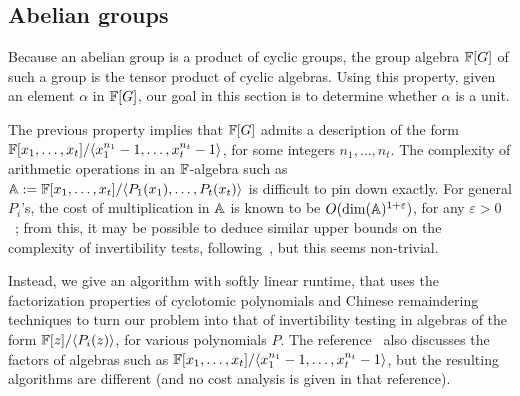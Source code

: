 
\subsection{Abelian groups}

Because an abelian group is a product of cyclic groups, the group
algebra $\mathbb{F}[G]$ of such a group is the tensor product of cyclic
algebras. Using this property, given an element $\alpha$ in $\mathbb{F}[G]$,
our goal in this section is to determine whether $\alpha$ is a unit.

The previous property implies that $\mathbb{F}[G]$ admits a description of the
form $\mathbb{F}[x_1,\dots,x_t]/\langle x_1^{n_1}-1,\dots,x_t^{n_t}-1\rangle$,
for some integers $n_1,\dots,n_t$. The complexity of arithmetic
operations in an $\mathbb{F}$-algebra such as $\mathbb{A}:=\mathbb{F}[x_1,\dots,x_t]/\langle
P_1(x_1),\dots,P_t(x_t)\rangle$ is difficult to pin down exactly. For
general $P_i$'s, the cost of multiplication in $\mathbb{A}$ is known to be
$O(\dim(\mathbb{A})^{1+\varepsilon})$, for any $\varepsilon >
0$~\cite[Theorem~2]{LiMoSc09}; from this, it may be possible to deduce
similar upper bounds on the complexity of invertibility tests,
following~\cite{DaMMMScXi06}, but this seems non-trivial.

Instead, we give an algorithm with softly linear runtime, that uses
the factorization properties of cyclotomic polynomials and Chinese
remaindering techniques to turn our problem into that of invertibility
testing in algebras of the form $\mathbb{F}[z]/\langle P_i(z) \rangle$, for
various polynomials $P$. The reference~\cite{Poli} also discusses the
factors of algebras such as $\mathbb{F}[x_1,\dots,x_t]/\langle
x_1^{n_1}-1,\dots,x_t^{n_t}-1\rangle$, but the resulting algorithms are 
different (and no cost analysis is given in that reference).

\smallskip

